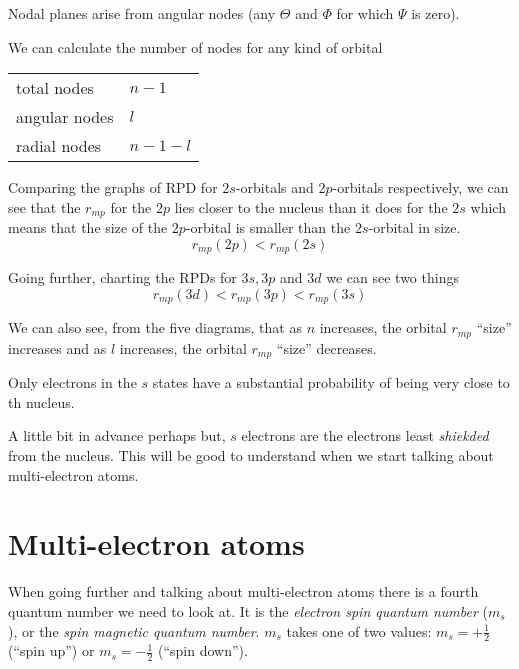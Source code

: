 \documentclass[../mit-general-chemistry.tex]{subfiles}
\begin{document}
Nodal planes arise from angular nodes (any $\Theta$ and $\Phi$ for
which $\Psi$ is zero).

We can calculate the number of nodes for any kind of orbital

\begin{center}
  \begin{tabular}{ll}
    total nodes & $n - 1$ \\
    angular nodes & $l$ \\
    radial nodes & $n - 1 - l$ \\
  \end{tabular}
\end{center}


Comparing the graphs of RPD for $2s$-orbitals and $2p$-orbitals
respectively, we can see that the $r_{mp}$ for the $2p$ lies closer to
the nucleus than it does for the $2s$ which means that the size of the
$2p$-orbital is smaller than the $2s$-orbital in size.
\begin{equation*}
  r_{mp}(2p) <   r_{mp}(2s)
\end{equation*}

Going further, charting the RPDs for $3s, 3p$ and $3d$ we can see two
things
\begin{equation*}
  r_{mp}(3d) <   r_{mp}(3p) < r_{mp}(3s)
\end{equation*}

We can also see, from the five diagrams, that as $n$ increases, the
orbital $r_{mp}$ ``size'' increases and as $l$ increases, the orbital
$r_{mp}$ ``size'' decreases.

Only electrons in the $s$ states have a substantial probability of
being very close to th nucleus.

A little bit in advance perhaps but, $s$ electrons are the electrons least {\em
  shiekded} from the nucleus. This will be good to understand when we
start talking about multi-electron atoms.






\section{Multi-electron atoms}


When going further and talking about multi-electron atoms there is a
fourth quantum number we need to look at. It is the {\em electron spin
  quantum number} ($m_s$), or the {\em spin magnetic quantum
  number}. $m_s$ takes one of two values: $m_s = +\frac{1}{2}$ (``spin
up'') or $m_s = -\frac{1}{2}$ (``spin down'').
\end{document}
